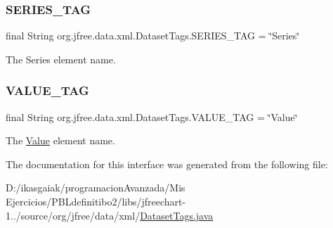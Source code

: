 \subsubsection{\texorpdfstring{S\+E\+R\+I\+E\+S\+\_\+\+T\+AG}{SERIES\_TAG}}
{\footnotesize\ttfamily final String org.\+jfree.\+data.\+xml.\+Dataset\+Tags.\+S\+E\+R\+I\+E\+S\+\_\+\+T\+AG = \char`\"{}Series\char`\"{}\hspace{0.3cm}{\ttfamily [static]}}

The \textquotesingle{}Series\textquotesingle{} element name. \mbox{\label{interfaceorg_1_1jfree_1_1data_1_1xml_1_1_dataset_tags_aa6f62e3aa7c7d0655329bd3a0afe578e}} 
\subsubsection{\texorpdfstring{V\+A\+L\+U\+E\+\_\+\+T\+AG}{VALUE\_TAG}}
{\footnotesize\ttfamily final String org.\+jfree.\+data.\+xml.\+Dataset\+Tags.\+V\+A\+L\+U\+E\+\_\+\+T\+AG = \char`\"{}Value\char`\"{}\hspace{0.3cm}{\ttfamily [static]}}

The \textquotesingle{}\mbox{\hyperlink{interfaceorg_1_1jfree_1_1data_1_1_value}{Value}}\textquotesingle{} element name. 

The documentation for this interface was generated from the following file\+:\begin{DoxyCompactItemize}
\item 
D\+:/ikasgaiak/programacion\+Avanzada/\+Mis Ejercicios/\+P\+B\+Ldefinitibo2/libs/jfreechart-\/1../source/org/jfree/data/xml/\mbox{\hyperlink{_dataset_tags_8java}{Dataset\+Tags.\+java}}\end{DoxyCompactItemize}
